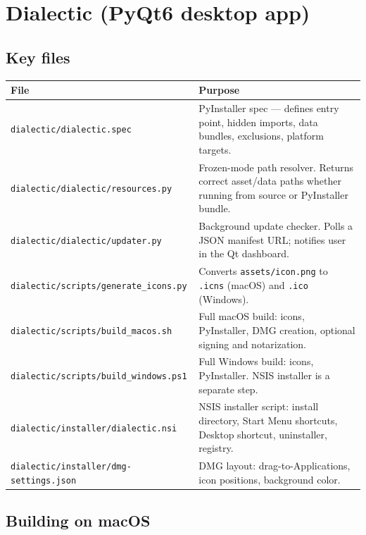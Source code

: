\documentclass[11pt,letterpaper]{article}
\newcommand{\file}[1]{\texttt{#1}}
\begin{document}
\section{Dialectic (PyQt6 desktop app)}

\subsection{Key files}

\begin{table}[h]
\small
\begin{tabular}{p{5.5cm} p{9cm}}
\toprule
\textbf{File} & \textbf{Purpose} \\
\midrule
\file{dialectic/dialectic.spec}             & PyInstaller spec --- defines entry point, hidden imports, data bundles, exclusions, platform targets. \\
\file{dialectic/dialectic/resources.py}     & Frozen-mode path resolver. Returns correct asset/data paths whether running from source or PyInstaller bundle. \\
\file{dialectic/dialectic/updater.py}       & Background update checker. Polls a JSON manifest URL; notifies user in the Qt dashboard. \\
\file{dialectic/scripts/generate\_icons.py} & Converts \file{assets/icon.png} to \file{.icns} (macOS) and \file{.ico} (Windows). \\
\file{dialectic/scripts/build\_macos.sh}    & Full macOS build: icons, PyInstaller, DMG creation, optional signing and notarization. \\
\file{dialectic/scripts/build\_windows.ps1} & Full Windows build: icons, PyInstaller. NSIS installer is a separate step. \\
\file{dialectic/installer/dialectic.nsi}    & NSIS installer script: install directory, Start Menu shortcuts, Desktop shortcut, uninstaller, registry. \\
\file{dialectic/installer/dmg-settings.json}& DMG layout: drag-to-Applications, icon positions, background color. \\
\bottomrule
\end{tabular}
\end{table}

\subsection{Building on macOS}
\end{document}
